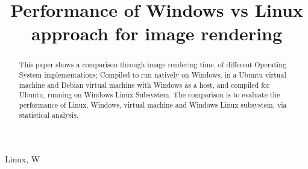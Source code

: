 \documentclass[conference]{IEEEtran}
\begin{document}
\title{Performance of Windows vs Linux approach for image rendering}

\author{

}

\maketitle

\begin{abstract}
This paper shows a comparison through image rendering time, of different Operating System implementations; Compiled to run natively on Windows, in a Ubuntu virtual machine and Debian virtual machine with Windows as a host, and compiled for Ubuntu, running on Windows Linux Subsystem. The comparison is to evaluate the performance of Linux, Windows, virtual machine and Windows Linux subsystem, via statistical analysis. 

\end{abstract}

\begin{IEEEkeywords}
Linux, W
\end{IEEEkeywords}
\end{document}
